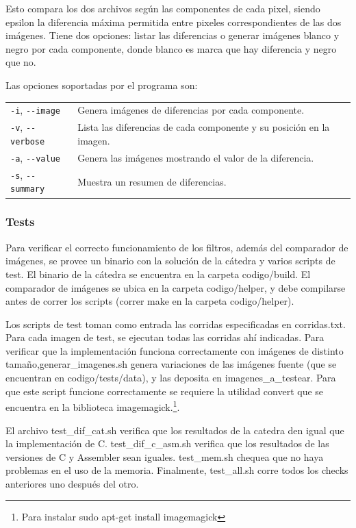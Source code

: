 \documentclass[a4paper, 12pt]{article}
\newcommand{\code}[1]{{\sffamily #1}\xspace}
\begin{document}
Esto compara los dos archivos según las componentes de cada pixel, siendo epsilon la diferencia máxima permitida entre pixeles correspondientes de las dos imágenes.
Tiene dos opciones: listar las diferencias o generar imágenes blanco y negro por cada componente, donde blanco es marca que hay diferencia y negro que no.

\bigskip
Las opciones soportadas por el programa son:

\begin{tabular}{l|l}
  \verb|-i|, \verb|--image|    &  Genera imágenes de diferencias por cada componente.\\
  \verb|-v|, \verb|--verbose|  &  Lista las diferencias de cada componente y su posición en la imagen.\\
  \verb|-a|, \verb|--value|    &  Genera las imágenes mostrando el valor de la diferencia.\\
  \verb|-s|, \verb|--summary|  &  Muestra un resumen de diferencias.\\
\end{tabular}

\subsubsection*{Tests}
Para verificar el correcto funcionamiento de los filtros,
además del comparador de imágenes, se provee un binario
con la solución de la cátedra y varios scripts de test.
El binario de la cátedra se encuentra en la carpeta {\code{codigo/build}}.
El comparador de imágenes se ubica en la carpeta {\code{codigo/helper}}, y debe
compilarse antes de correr los scripts (correr {\code{make}} en la carpeta {\code{codigo/helper}}).

Los scripts de test toman como entrada las corridas especificadas en {\code{corridas.txt}}.
Para cada imagen de test, se ejecutan todas las corridas ahí indicadas.
Para verificar que la implementación funciona correctamente con imágenes de distinto
tamaño,{ \code{generar\_imagenes.sh}} genera variaciones de las imágenes fuente
(que se encuentran en {\code{codigo/tests/data}}), y las deposita en {\code{imagenes\_a\_testear}}.
Para que este script funcione correctamente se requiere la utilidad {\code{convert}} que se encuentra
en la biblioteca {\code{imagemagick}}.\footnote{Para instalar \code{sudo apt-get install imagemagick}}.

El archivo {\code{test\_dif\_cat.sh}} verifica que los resultados de la catedra den igual que la implementación de C.
{\code{test\_dif\_c\_asm.sh}} verifica que los resultados de las versiones de C y Assembler sean iguales.
{\code{test\_mem.sh}} chequea que no haya problemas en el uso de la memoria.
Finalmente, {\code{test\_all.sh}} corre todos los checks anteriores uno después del otro.
\end{document}
